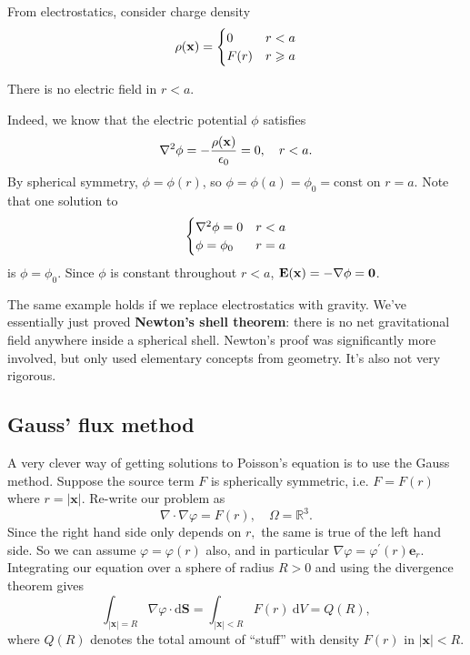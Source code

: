\begin{example}
    From electrostatics, consider charge density
    \[
        \rho({\bf x}) = \begin{cases}
        0 &r<a\\
        F(r) &r\geqslant a\\
        \end{cases} 
    \]
    \begin{claim}
        There is no electric field in $ r<a $.
    \end{claim}
    Indeed, we know that the electric potential $ \phi $ satisfies 
    \[
        \laplacian \phi = -\frac{\rho(\bfx)}{\epsilon_0}=0,\quad r<a.
    \]
    By spherical symmetry, $ \phi=\phi(r) $, so $ \phi=\phi(a)=\phi_0=\text{const} $ on $ r=a $. Note that one solution to 
    \[
        \begin{cases}
        \laplacian \phi=0 &r<a\\
        \phi=\phi_0 &r=a\\
        \end{cases} 
    \]
    is $ \phi=\phi_0 $. Since $\phi$ is constant throughout $r < a$, ${\bf E}({\bf x}) = - \nabla \phi= \mathbf{0}$.
\end{example}

The same example holds if we replace electrostatics with gravity. We’ve essentially just proved \textbf{Newton’s shell theorem}: there is no net gravitational field anywhere inside a spherical shell. Newton’s proof was significantly more involved, but only used elementary concepts from geometry. It’s also not very rigorous.

\subsection{Gauss’ flux method}
A very clever way of getting solutions to Poisson's equation is to use the Gauss method. Suppose the source term $F$ is spherically symmetric, i.e. $F=F(r)$ where $r=|\mathbf{x}| .$ Re-write our problem as
\[
    \nabla \cdot \nabla \varphi=F(r),\quad \Omega = \mathbb{R}^{3}.
\]
Since the right hand side only depends on $r,$ the same is true of the left hand side. So we can assume $\varphi=\varphi(r)$ also, and in particular $\nabla \varphi=\varphi^{\prime}(r) \mathbf{e}_{r} .$ Integrating our equation
over a sphere of radius $R>0$ and using the divergence theorem gives
\[
    \int_{|\mathbf{x}|=R} \nabla \varphi \cdot \mathrm{d} \mathbf{S}=\int_{|\mathbf{x}|<R} F(r) \mathrm{~d} V = Q(R),
\]
where $Q(R)$ denotes the total amount of ``stuff'' with density $F(r)$ in $|\mathbf{x}|<R$.

